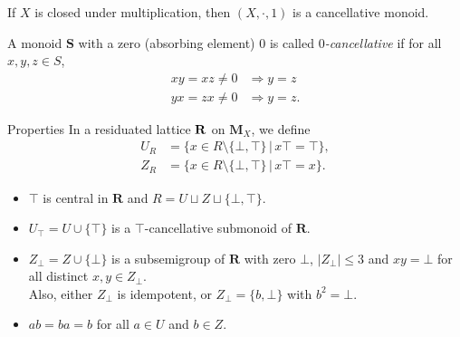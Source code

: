 \documentclass[professionalfont, 10pt]{beamer} %
\theoremstyle{plain}
\theoremstyle{definition}
\begin{document}
\begin{frame}
    If $X$ is closed under multiplication, then $(X, \cdot, 1)$ is a cancellative monoid. \pause

    A monoid $\mathbf{S}$ with a zero (absorbing element) $0$ is called \emph{$0$-cancellative} if for all $x, y, z \in S$,
    \begin{align*}
        xy = xz \neq 0 & \Rightarrow y = z\\
        yx = zx \neq 0 & \Rightarrow y = z.
    \end{align*}
    
\end{frame}

\begin{frame}{Properties}
In a residuated lattice $\bf{R}$ on $\mathbf{M}_X$, we define
\begin{align*}
    U_R & = \{x \in R \setminus \{\bot, \top\} \, | \, x \top = \top\},\\
    Z_R & = \{x \in R \setminus \{\bot, \top\} \, | \,  x \top = x\}.
\end{align*}

\pause

\begin{itemize}
    \item $\top$ is central in $\mathbf{R}$ and $R = U \sqcup Z \sqcup \{\bot, \top\}$. \pause
    
    \item $U_{\top} = U \cup \{\top\}$ is a $\top$-cancellative submonoid of $\mathbf{R}$. \pause
    
    \item $Z_{\bot} = Z \cup \{\bot\}$ is a subsemigroup of $\mathbf{R}$ with zero $\bot$, $|Z_{\bot}| \leq 3$ and $xy = \bot$ for all distinct $x, y \in Z_{\bot}$.\\    
    Also, either $Z_{\bot}$ is idempotent, or $Z_{\bot} = \{b, \bot\}$ with $b^2=\bot$. \pause
    
    \item $ab = ba = b$ for all $a \in U$ and $b \in Z$.\pause
\end{itemize}


\end{frame}
\end{document}
